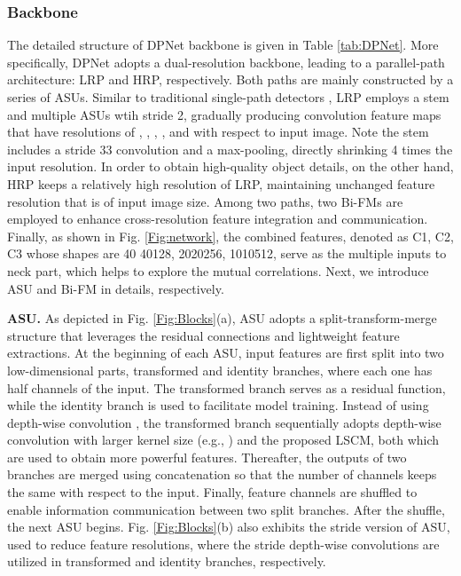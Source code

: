 \documentclass[lettersize,journal]{IEEEtran}
\begin{document}
\subsubsection{Backbone}

The detailed structure of DPNet backbone is given in Table \ref{tab:DPNet}. More specifically, DPNet adopts a dual-resolution backbone, leading to a parallel-path architecture: LRP and HRP, respectively. Both paths are mainly constructed by a series of ASUs. Similar to traditional single-path detectors \cite{qin2019thundernet,Pelee,li2018tiny}, LRP employs a stem and multiple ASUs wtih stride 2, gradually producing convolution feature maps that have resolutions of , , , , and  with respect to input image. Note the stem includes a stride 33 convolution and a max-pooling, directly shrinking 4 times the input resolution. In order to obtain high-quality object details, on the other hand, HRP keeps a relatively high resolution of LRP, maintaining unchanged feature resolution that is  of input image size. Among two paths, two Bi-FMs are employed to enhance cross-resolution feature integration and communication. Finally, as shown in Fig. \ref{Fig:network}, the combined features, denoted as C1, C2, C3 whose shapes are 40 40128, 2020256, 1010512, serve as the multiple inputs to neck part, which helps to explore the mutual correlations. Next, we introduce ASU and Bi-FM in details, respectively.

\noindent \textbf{ASU.} As depicted in Fig. \ref{Fig:Blocks}(a), ASU adopts a split-transform-merge structure that leverages the residual connections and lightweight feature extractions. At the beginning of each ASU, input features are first split into two low-dimensional parts, transformed and identity branches, where each one has half channels of the input. The transformed branch serves as a residual function, while the identity branch is used to facilitate model training. Instead of using  depth-wise convolution \cite{ma2018shufflenet}, the transformed branch sequentially adopts depth-wise convolution with larger kernel size (e.g., ) and the proposed LSCM, both which are used to obtain more powerful features. Thereafter, the outputs of two branches are merged using concatenation so that the number of channels keeps the same with respect to the input. Finally, feature channels are shuffled to enable information communication between two split branches. After the shuffle, the next ASU begins. Fig. \ref{Fig:Blocks}(b) also exhibits the stride version of ASU, used to reduce feature resolutions, where the  stride depth-wise convolutions are utilized in transformed and identity branches, respectively.
\end{document}
